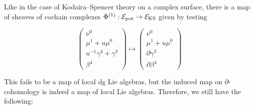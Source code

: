 \documentclass[11pt]{amsart}
\begin{document}
Like in the case of Kodaira--Spencer theory on a complex surface, there is a  map of sheaves of cochain complexes $\Phi^{(1)}: \mathcal E_{\rm pot}\to \mathcal E_{\rm KS}$ given by testing

\[\begin{pmatrix}\nu^{0} \\ \mu^{1}+u\mu^{0} \\ u^{-1}\gamma^{4}+\gamma^{3} \\ \beta^{4}\end{pmatrix}\mapsto \begin{pmatrix}\nu^{0} \\ \mu^{1}+u\mu^{0} \\ \partial\gamma^{3} \\ \partial\beta^{4}\end{pmatrix}\]

This fails to be a map of local dg Lie algebras, but the induced map on $\partial$-cohomology is indeed a map of local Lie algebras. Therefore, we still have the following:
\end{document}
